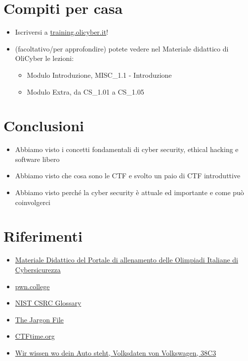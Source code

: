 \documentclass{beamer}
\begin{document}
\section*{Compiti per casa}
\begin{frame}{\insertsection}
\begin{itemize}
\item Iscriversi a \href{https://training.olicyber.it}{training.olicyber.it}!
\item (facoltativo/per approfondire) potete vedere nel \alert{Materiale
didattico} di OliCyber le lezioni:
\begin{itemize}
\item Modulo Introduzione, MISC\_1.1 - Introduzione
\item Modulo Extra, da CS\_1.01 a CS\_1.05
\end{itemize}
\end{itemize}
\end{frame}

\section{Conclusioni}
\begin{frame}{\insertsection}
\begin{itemize}
\item Abbiamo visto i concetti fondamentali di \alert{cyber security},
\alert{ethical hacking} e \alert{software libero}
\item Abbiamo visto che cosa sono le \alert{CTF} e svolto un paio di CTF
introduttive
\item Abbiamo visto perché la \alert{cyber security} è attuale ed importante e
come può coinvolgerci
\end{itemize}
\end{frame}

\section{Riferimenti}
\begin{frame}{\insertsection}
\begin{itemize}
\item \href{https://training.olicyber.it/training}{Materiale Didattico del Portale di allenamento delle Olimpiadi Italiane di Cybersicurezza} 
\item \href{https://pwn.college/}{pwn.college}
\item \href{https://csrc.nist.gov/glossary}{NIST CSRC Glossary}
\item \href{http://www.catb.org/jargon/html/}{The Jargon File}
\item \href{https://ctftime.org/}{CTFtime.org}
\item \href{https://media.ccc.de/v/38c3-wir-wissen-wo-dein-auto-steht-volksdaten-von-volkswagen}{Wir wissen wo dein Auto steht, Volksdaten von Volkswagen, 38C3}
\end{itemize}
\end{frame}
\end{document}
